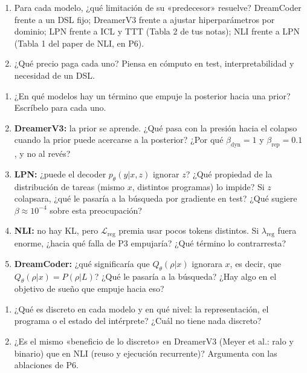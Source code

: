 \documentclass[11pt,a4paper]{article}
\begin{document}
\begin{guia}[(1) Ventajas]
\begin{enumerate}[leftmargin=*]
  \item Para cada modelo, ¿qué limitación de su «predecesor» resuelve? DreamCoder frente a un DSL fijo; DreamerV3 frente a ajustar hiperparámetros por dominio; LPN frente a ICL y TTT (Tabla 2 de tus notas); NLI frente a LPN (Tabla 1 del paper de NLI, en P6).
  \item ¿Qué precio paga cada uno? Piensa en cómputo en test, interpretabilidad y necesidad de un DSL.
\end{enumerate}
\end{guia}

\begin{guia}
\begin{enumerate}[leftmargin=*,resume]
  \item ¿En qué modelos hay un término que empuje la posterior hacia una prior? Escríbelo para cada uno.
  \item \textbf{DreamerV3:} la prior se aprende. ¿Qué pasa con la presión hacia el colapso cuando la prior puede acercarse a la posterior? ¿Por qué $\beta_{\mathrm{dyn}}=1$ y $\beta_{\mathrm{rep}}=0.1$, y no al revés?
  \item \textbf{LPN:} ¿puede el decoder $p_\theta(y|x,z)$ ignorar $z$? ¿Qué propiedad de la distribución de tareas (mismo $x$, distintos programas) lo impide? Si $z$ colapsara, ¿qué le pasaría a la búsqueda por gradiente en test? ¿Qué sugiere $\beta\approx10^{-4}$ sobre esta preocupación?
  \item \textbf{NLI:} no hay KL, pero $\mathcal L_{\mathrm{reg}}$ premia usar pocos tokens distintos. Si $\lambda_{\mathrm{reg}}$ fuera enorme, ¿hacia qué falla de P3 empujaría? ¿Qué término lo contrarresta?
  \item \textbf{DreamCoder:} ¿qué significaría que $Q_\theta(\rho|x)$ ignorara $x$, es decir, que $Q_\theta(\rho|x)=P(\rho|L)$? ¿Qué le pasaría a la búsqueda? ¿Hay algo en el objetivo de sueño que empuje hacia eso?
\end{enumerate}
\end{guia}

\begin{guia}[(2b) Lo discreto]
\begin{enumerate}[leftmargin=*,resume]
  \item ¿Qué es discreto en cada modelo y en qué nivel: la representación, el programa o el estado del intérprete? ¿Cuál no tiene nada discreto?
  \item ¿Es el mismo «beneficio de lo discreto» en DreamerV3 (Meyer et al.: ralo y binario) que en NLI (reuso y ejecución recurrente)? Argumenta con las ablaciones de P6.
\end{enumerate}
\end{guia}
\end{document}
